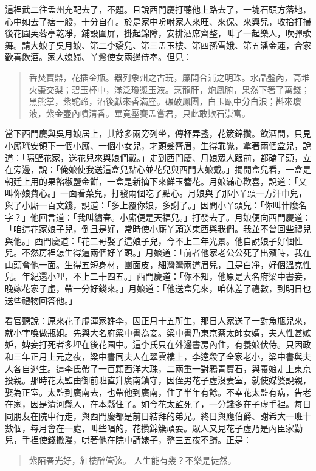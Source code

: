 這裡武二往孟州充配去了，不題。且說西門慶打聽他上路去了，一塊石頭方落地，心中如去了痞一般，十分自在。於是家中吩咐家人來旺、來保、來興兒，收拾打掃後花園芙蓉亭乾凈，鋪設圍屏，掛起錦障，安排酒席齊整，叫了一起樂人，吹彈歌舞。請大娘子吳月娘、第二李嬌兒、第三孟玉樓、第四孫雪娥、第五潘金蓮，合家歡喜飲酒。家人媳婦、丫鬟使女兩邊侍奉。但見：
\begin{quote}
香焚寶鼎，花插金瓶。器列象州之古玩，簾開合浦之明珠。水晶盤內，高堆火棗交梨；碧玉杯中，滿泛瓊漿玉液。烹龍肝，炮鳳腑，果然下箸了萬錢；黑熊掌，紫駝蹄，酒後獻來香滿座。碾破鳳團，白玉甌中分白浪；斟來瓊液，紫金壺內噴清香。畢竟壓賽孟嘗君，只此敢欺石崇富。
\end{quote}

當下西門慶與吳月娘居上，其餘多兩旁列坐，傳杯弄盞，花簇錦攢。飲酒間，只見小廝玳安領下一個小廝、一個小女兒，才頭髮齊眉，生得乖覺，拿著兩個盒兒，說道：「隔壁花家，送花兒來與娘們戴。」走到西門慶、月娘眾人跟前，都磕了頭，立在旁邊，說：「俺娘使我送這盒兒點心並花兒與西門大娘戴。」揭開盒兒看，一盒是朝廷上用的果餡椒鹽金餅，一盒是新摘下來鮮玉簪花。月娘滿心歡喜，說道：「又叫你娘費心。」一面看菜兒，打發兩個吃了點心。月娘與了那小丫頭一方汗巾兒，與了小廝一百文錢，說道：「多上覆你娘，多謝了。」因問小丫頭兒：「你叫什麼名字？」他回言道：「我叫繡春。小廝便是天福兒。」打發去了。月娘便向西門慶道：「咱這花家娘子兒，倒且是好，常時使小廝丫頭送東西與我們。我並不曾回些禮兒與他。」西門慶道：「花二哥娶了這娘子兒，今不上二年光景。他自說娘子好個性兒。不然房裡怎生得這兩個好丫頭。」月娘道：「前者他家老公公死了出殯時，我在山頭會他一面。生得五短身材，團面皮，細灣灣兩道眉兒，且是白凈，好個溫克性兒。年紀還小哩，不上二十四五。」西門慶道：「你不知，他原是大名府梁中書妾，晚嫁花家子虛，帶一分好錢來。」月娘道：「他送盒兒來，咱休差了禮數，到明日也送些禮物回答他。」

看官聽說：原來花子虛渾家姓李，因正月十五所生，那日人家送了一對魚瓶兒來，就小字喚做瓶姐。先與大名府梁中書為妾。梁中書乃東京蔡太師女婿，夫人性甚嫉妒，婢妾打死者多埋在後花園中。這李氏只在外邊書房內住，有養娘伏侍。只因政和三年正月上元之夜，梁中書同夫人在翠雲樓上，李逵殺了全家老小，梁中書與夫人各自逃生。這李氏帶了一百顆西洋大珠，二兩重一對鴉青寶石，與養娘走上東京投親。那時花太監由御前班直升廣南鎮守，因侄男花子虛沒妻室，就使媒婆說親，娶為正室。太監到廣南去，也帶他到廣南，住了半年有餘。不幸花太監有病，告老在家，因是清河縣人，在本縣住了。如今花太監死了，一分錢多在子虛手裡。每日同朋友在院中行走，與西門慶都是前日結拜的弟兄。終日與應伯爵、謝希大一班十數個，每月會在一處，叫些唱的，花攢錦簇頑耍。眾人又見花子虛乃是內臣家勤兒，手裡使錢撒漫，哄著他在院中請婊子，整三五夜不歸。正是：
\begin{quote}
紫陌春光好，紅樓醉管弦。
人生能有幾？不樂是徒然。
\end{quote}

